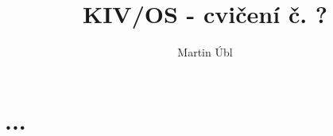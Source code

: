 \documentclass{article}
\author{Martin Úbl}
\title{KIV/OS - cvičení č. ?}
\begin{document}
\maketitle



\section{...}
\end{document}
